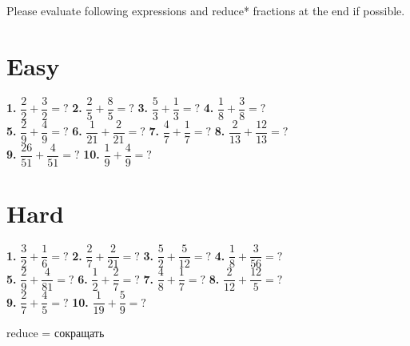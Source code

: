 \documentclass[a4paper, 12pt]{article}
\begin{document}
	{\large Please evaluate following expressions and reduce* fractions at the end if possible.}	
	
	\section* {{\Large Easy}}
	
	{\Large \textbf{1.} $\dfrac{2}{2}+\dfrac{3}{2} = ?$ \hspace{0.6cm}
		   \textbf{2.} $\dfrac{2}{5}+\dfrac{8}{5} = ?$ \hspace{0.6cm}
		   \textbf{3.} $\dfrac{5}{3}+\dfrac{1}{3} = ?$ \hspace{0.6cm}
		   \textbf{4.} $\dfrac{1}{8}+\dfrac{3}{8} = ?$ \\ [0.6cm]
		   \textbf{5.} $\dfrac{2}{9}+\dfrac{4}{9} = ?$ \hspace{0.6cm}
		   \textbf{6.} $\dfrac{1}{21}+\dfrac{2}{21} = ?$ \hspace{0.6cm}
		   \textbf{7.} $\dfrac{4}{7}+\dfrac{1}{7} = ?$ \hspace{0.6cm}
		   \textbf{8.} $\dfrac{2}{13}+\dfrac{12}{13} = ?$ \\ [0.6cm]
		   \textbf{9.} $\dfrac{26}{51}+\dfrac{4}{51} = ?$ \hspace{0.6cm}
		   \textbf{10.} $\dfrac{1}{9}+\dfrac{4}{9} = ?$}
	
	\section* {{\Large Hard}}
	
	{\Large \textbf{1.} $\dfrac{3}{2}+\dfrac{1}{6} = ?$ \hspace{0.6cm}
		   \textbf{2.} $\dfrac{2}{7}+\dfrac{2}{21} = ?$ \hspace{0.6cm}
		   \textbf{3.} $\dfrac{5}{2}+\dfrac{5}{12} = ?$ \hspace{0.6cm}
		   \textbf{4.} $\dfrac{1}{8}+\dfrac{3}{56} = ?$ \\ [0.6cm]
		   \textbf{5.} $\dfrac{2}{9}+\dfrac{4}{81} = ?$ \hspace{0.6cm}
		   \textbf{6.} $\dfrac{1}{2}+\dfrac{2}{7} = ?$ \hspace{0.6cm}
		   \textbf{7.} $\dfrac{4}{8}+\dfrac{1}{7} = ?$ \hspace{0.6cm}
		   \textbf{8.} $\dfrac{2}{12}+\dfrac{12}{5} = ?$ \\ [0.6cm]
		   \textbf{9.} $\dfrac{2}{7}+\dfrac{4}{5} = ?$  \hspace{0.6cm}
		   \textbf{10.} $\dfrac{1}{19}+\dfrac{5}{9} = ?$ \\ [0.6cm]}
	   
	 {\large *reduce = сокращать}
		
\end{document}
